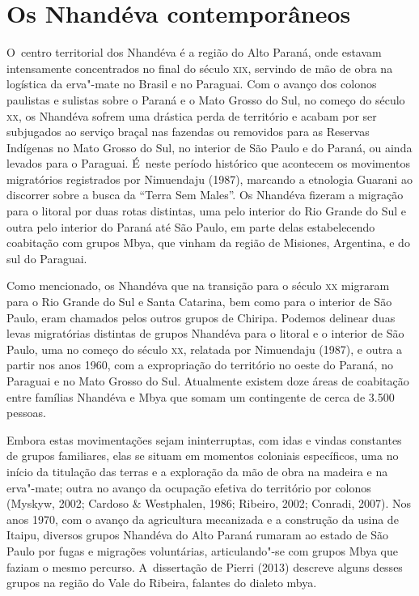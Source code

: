 \section{Os Nhandéva contemporâneos}

O~centro territorial dos Nhandéva é a região do Alto Paraná, onde
estavam intensamente concentrados no final do século \textsc{xix}, servindo de
mão de obra na logística da erva"-mate no Brasil e no Paraguai. Com o
avanço dos colonos paulistas e sulistas sobre o Paraná e o Mato Grosso
do Sul, no começo do século \textsc{xx}, os Nhandéva sofrem uma drástica perda
de território e acabam por ser subjugados ao serviço braçal nas
fazendas ou removidos para as Reservas Indígenas no Mato Grosso do Sul,
no interior de São Paulo e do Paraná, ou ainda levados para o Paraguai.
É~neste período histórico que acontecem os movimentos migratórios
registrados por Nimuendaju (1987), marcando a etnologia Guarani ao
discorrer sobre a busca da ``Terra Sem Males''. Os Nhandéva fizeram a
migração para o litoral por duas rotas distintas, uma pelo interior do
Rio Grande do Sul e outra pelo interior do Paraná até São Paulo, em
parte delas estabelecendo coabitação com grupos Mbya, que vinham da
região de Misiones, Argentina, e do sul do Paraguai.

Como mencionado, os Nhandéva que na transição para o século \textsc{xx}
migraram para o Rio Grande do Sul e Santa Catarina, bem como para o
interior de São Paulo, eram chamados pelos outros grupos de Chiripa.
Podemos delinear duas levas migratórias distintas de grupos Nhandéva
para o litoral e o interior de São Paulo, uma no começo do século \textsc{xx},
relatada por Nimuendaju (1987), e outra a partir nos anos 1960, com a
expropriação do território no oeste do Paraná, no Paraguai e no Mato
Grosso do Sul. Atualmente existem doze áreas de coabitação entre
famílias Nhandéva e Mbya que somam um contingente de cerca de 3.500
pessoas.

Embora estas movimentações sejam ininterruptas, com idas e
vindas constantes de grupos familiares, elas se situam em momentos
coloniais específicos, uma no início da titulação das terras e a
exploração da mão de obra na madeira e na erva"-mate; outra no avanço da
ocupação efetiva do território por colonos (Myskyw, 2002; Cardoso \&
Westphalen, 1986; Ribeiro, 2002; Conradi, 2007). Nos anos 1970, com o
avanço da agricultura mecanizada e a construção da usina de Itaipu,
diversos grupos Nhandéva do Alto Paraná rumaram ao estado de São Paulo
por fugas e migrações voluntárias, articulando"-se com grupos Mbya que
faziam o mesmo percurso. A~dissertação de Pierri (2013) descreve
alguns desses grupos na região do Vale do Ribeira, falantes do dialeto
mbya.

